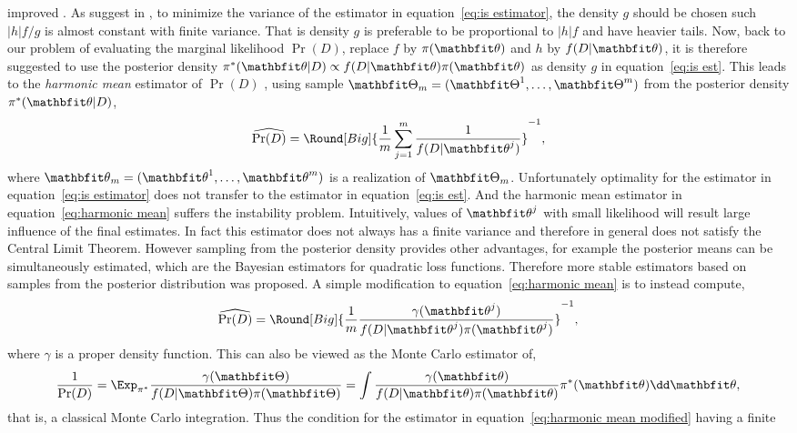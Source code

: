 improved \parencite{Casella1998}. As suggest in
\textcite[][sec.~3.3]{Robert2004}, to minimize the variance of the estimator
in equation~\eqref{eq:is estimator}, the density $g$ should be chosen such
$|h|f/g$ is almost constant with finite variance. That is density $g$ is
preferable to be proportional to $|h|f$ and have heavier tails. Now, back to
our problem of evaluating the marginal likelihood $\Pr(D)$, replace $f$ by
$\pi(\bth)$ and $h$ by $f(D|\bth)$, it is therefore suggested to use the
posterior density $\pi^*(\bth|D) \propto f(D|\bth)\pi(\bth)$ as density $g$ in
equation~\eqref{eq:is est}. This leads to the \emph{harmonic mean} estimator
of $\Pr(D)$ \parencite{Newton1994}, using sample $\bTh_m= \bThm$ from the
posterior density $\pi^*(\bth|D)$,
\begin{equation}
  \widehat{\Pr(D)} =
  \Round[Big]{\frac{1}{m}\sum_{j=1}^m\frac{1}{f(D|\bth^j)}}^{-1},
  \label{eq:harmonic mean}
\end{equation}
where $\bth_m = \bthm$ is a realization of $\bTh_m$. Unfortunately optimality
for the estimator in equation~\eqref{eq:is estimator} does not transfer to the
estimator in equation~\eqref{eq:is est}. And the harmonic mean estimator in
equation~\eqref{eq:harmonic mean} suffers the instability problem.
Intuitively, values of $\bth^j$ with small likelihood will result large
influence of the final estimates. In fact this estimator does not always has a
finite variance and therefore in general does not satisfy the Central Limit
Theorem. However sampling from the posterior density provides other
advantages, for example the posterior means can be simultaneously estimated,
which are the Bayesian estimators for quadratic loss functions. Therefore more
stable estimators based on samples from the posterior distribution was
proposed. A simple modification to equation~\eqref{eq:harmonic mean} is to
instead compute,
\begin{equation}
  \widehat{\Pr(D)} = \Round[Big]{
    \frac{1}{m}\frac{\gamma(\bth^j)}{f(D|\bth^j)\pi(\bth^j)}}^{-1},
  \label{eq:harmonic mean modified}
\end{equation}
where $\gamma$ is a proper density function. This can also be viewed as the
Monte Carlo estimator of,
\begin{equation}
  \frac{1}{\Pr(D)}
  = \Exp_{\pi^*}\frac{\gamma(\bTh)}{f(D|\bTh)\pi(\bTh)}
  = \int\frac{\gamma(\bth)}{f(D|\bth)\pi(\bth)}\pi^*(\bth)\dd\bth,
\end{equation}
that is, a classical Monte Carlo integration. Thus the condition for the
estimator in equation~\eqref{eq:harmonic mean modified} having a finite
